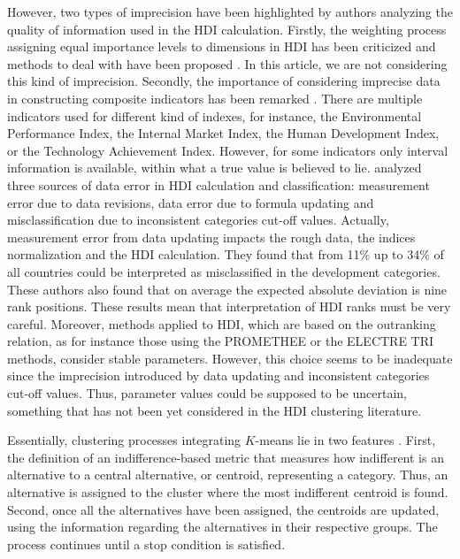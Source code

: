 \documentclass[]{elsarticle}
\theoremstyle{definition}
\begin{document}
However, two types of imprecision have been highlighted by authors analyzing the quality of information used in the HDI calculation.  Firstly, the weighting process assigning equal importance levels to dimensions in HDI has been criticized and methods to deal with have been proposed \citep{Zheng2015}. In this article, we are not considering this kind of imprecision.  Secondly, the importance of considering imprecise data in constructing composite indicators has been remarked \citep{Cherchye2011}.  There are multiple indicators used for different kind of indexes, for instance, the Environmental Performance Index, the Internal Market Index, the Human Development Index, or the Technology Achievement Index. However, for some indicators only interval information is available, within what a true value is believed to lie.   \cite{Wolff2011} analyzed three sources of data error in HDI calculation and classification: measurement error due to data revisions, data error due to formula updating and misclassification due to inconsistent categories cut-off values. Actually,  measurement error from data updating impacts the rough data, the indices normalization and the HDI calculation. They found that from 11\% up to 34\% of all countries could be interpreted as misclassified in the development categories. These authors also found that on average the expected absolute deviation is nine rank positions. These results mean that interpretation of HDI ranks must be very careful.  Moreover, methods applied to HDI, which are based on the outranking relation, as for instance those using the PROMETHEE or the ELECTRE TRI methods, consider stable parameters.  However, this choice seems to be inadequate since the imprecision introduced by data updating and   inconsistent categories cut-off values.  Thus, parameter values could be supposed to be uncertain, something that has not been yet considered in the HDI clustering literature.

Essentially, clustering processes integrating $K$-means lie in two features \citep{DeSmet2009,Lolli2014,Panapakidis2018, Chen2018}. First, the definition of  an indifference-based metric that measures how indifferent is an alternative to a central alternative, or centroid, representing a category. Thus, an alternative is assigned to the cluster where the most indifferent centroid is found. Second, once all the alternatives have been assigned, the centroids are updated, using the information regarding the alternatives in their respective groups.  The process continues until a stop condition is satisfied. 
\end{document}
